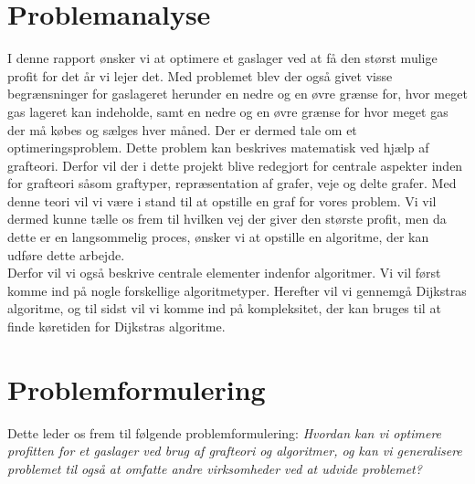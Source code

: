 \section{Problemanalyse}
I denne rapport ønsker vi at optimere et gaslager ved at få den størst mulige profit for det år vi lejer det. Med problemet blev der også givet visse begrænsninger for gaslageret herunder en nedre og en øvre grænse for, hvor meget gas lageret kan indeholde, samt en nedre og en øvre grænse for hvor meget gas der må købes og sælges hver måned. Der er dermed tale om et optimeringsproblem. Dette problem kan beskrives matematisk ved hjælp af grafteori. Derfor vil der i dette projekt blive redegjort for centrale aspekter inden for grafteori såsom
graftyper, repræsentation af grafer, veje og delte grafer. Med denne teori vil vi være i stand til at opstille en graf for vores problem. Vi vil dermed kunne tælle os frem til hvilken vej der giver den største profit, men da dette er en langsommelig proces, ønsker vi at opstille en algoritme, der kan udføre dette arbejde. \\ Derfor vil vi også beskrive centrale elementer indenfor algoritmer. Vi vil først komme ind på nogle forskellige algoritmetyper. Herefter vil vi gennemgå Dijkstras algoritme, og til sidst vil vi komme ind på kompleksitet, der kan bruges til at finde køretiden for Dijkstras algoritme.

\section{Problemformulering}
Dette leder os frem til følgende problemformulering:
\textit{Hvordan kan vi optimere profitten for et gaslager ved brug af grafteori og algoritmer, og kan vi generalisere problemet til også at omfatte andre virksomheder ved at udvide problemet?}


